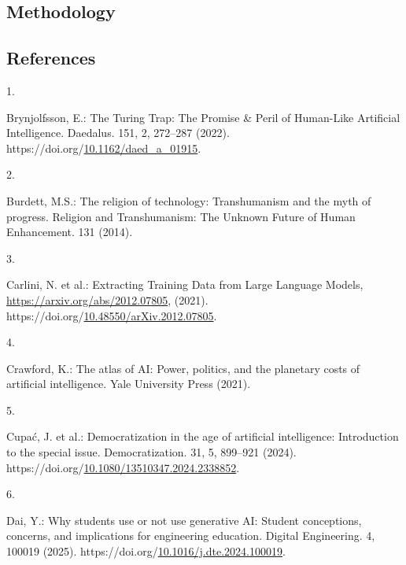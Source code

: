 \documentclass[
  letterpaper,
  DIV=11,
  numbers=noendperiod]{scrartcl}
\newlength{\cslhangindent}
\newlength{\csllabelwidth}
\newenvironment{CSLReferences}[2] %
 {\begin{list}{}{%
  \setlength{\itemindent}{0pt}
  \setlength{\leftmargin}{0pt}
  \setlength{\parsep}{0pt}
  \ifodd #1
   \setlength{\leftmargin}{\cslhangindent}
   \setlength{\itemindent}{-1\cslhangindent}
  \fi
  \setlength{\itemsep}{#2\baselineskip}}}
 {\end{list}}
\newcommand{\CSLLeftMargin}[1]{\parbox[t]{\csllabelwidth}{\strut#1\strut}}
\newcommand{\CSLRightInline}[1]{\parbox[t]{\linewidth - \csllabelwidth}{\strut#1\strut}}
\begin{document}
\subsection{Methodology}\label{methodology}

\subsection*{References}\label{references}

\label{refs}
\begin{CSLReferences}{0}{0}
\CSLLeftMargin{1. }%
\CSLRightInline{Brynjolfsson, E.: The {Turing Trap}: {The Promise} \&
{Peril} of {Human-Like Artificial Intelligence}. Daedalus. 151, 2,
272--287 (2022).
https://doi.org/\href{https://doi.org/10.1162/daed_a_01915}{10.1162/daed\_a\_01915}.}

\CSLLeftMargin{2. }%
\CSLRightInline{Burdett, M.S.: The religion of technology:
{Transhumanism} and the myth of progress. Religion and Transhumanism:
The Unknown Future of Human Enhancement. 131 (2014).}

\CSLLeftMargin{3. }%
\CSLRightInline{Carlini, N. et al.: Extracting {Training Data} from
{Large Language Models}, \url{https://arxiv.org/abs/2012.07805}, (2021).
https://doi.org/\href{https://doi.org/10.48550/arXiv.2012.07805}{10.48550/arXiv.2012.07805}.}

\CSLLeftMargin{4. }%
\CSLRightInline{Crawford, K.: The atlas of {AI}: {Power}, politics, and
the planetary costs of artificial intelligence. Yale University Press
(2021).}

\CSLLeftMargin{5. }%
\CSLRightInline{Cupać, J. et al.: Democratization in the age of
artificial intelligence: Introduction to the special issue.
Democratization. 31, 5, 899--921 (2024).
https://doi.org/\href{https://doi.org/10.1080/13510347.2024.2338852}{10.1080/13510347.2024.2338852}.}

\CSLLeftMargin{6. }%
\CSLRightInline{Dai, Y.: Why students use or not use generative {AI}:
{Student} conceptions, concerns, and implications for engineering
education. Digital Engineering. 4, 100019 (2025).
https://doi.org/\href{https://doi.org/10.1016/j.dte.2024.100019}{10.1016/j.dte.2024.100019}.}


\end{CSLReferences}
\end{document}
